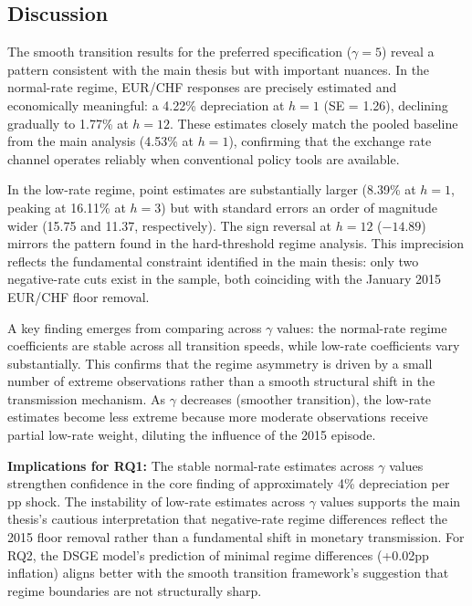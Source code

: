 \documentclass[12pt,a4paper]{article}
\begin{document}
\subsection{Discussion}

The smooth transition results for the preferred specification ($\gamma = 5$) reveal a pattern consistent with the main thesis but with important nuances. In the normal-rate regime, EUR/CHF responses are precisely estimated and economically meaningful: a 4.22\% depreciation at $h=1$ (SE = 1.26), declining gradually to 1.77\% at $h=12$. These estimates closely match the pooled baseline from the main analysis (4.53\% at $h=1$), confirming that the exchange rate channel operates reliably when conventional policy tools are available.

In the low-rate regime, point estimates are substantially larger (8.39\% at $h=1$, peaking at 16.11\% at $h=3$) but with standard errors an order of magnitude wider (15.75 and 11.37, respectively). The sign reversal at $h=12$ ($-14.89$) mirrors the pattern found in the hard-threshold regime analysis. This imprecision reflects the fundamental constraint identified in the main thesis: only two negative-rate cuts exist in the sample, both coinciding with the January 2015 EUR/CHF floor removal.

A key finding emerges from comparing across $\gamma$ values: the normal-rate regime coefficients are stable across all transition speeds, while low-rate coefficients vary substantially. This confirms that the regime asymmetry is driven by a small number of extreme observations rather than a smooth structural shift in the transmission mechanism. As $\gamma$ decreases (smoother transition), the low-rate estimates become less extreme because more moderate observations receive partial low-rate weight, diluting the influence of the 2015 episode.

\textbf{Implications for RQ1:} The stable normal-rate estimates across $\gamma$ values strengthen confidence in the core finding of approximately 4\% depreciation per pp shock. The instability of low-rate estimates across $\gamma$ values supports the main thesis's cautious interpretation that negative-rate regime differences reflect the 2015 floor removal rather than a fundamental shift in monetary transmission. For RQ2, the DSGE model's prediction of minimal regime differences (+0.02pp inflation) aligns better with the smooth transition framework's suggestion that regime boundaries are not structurally sharp.


\end{document}
